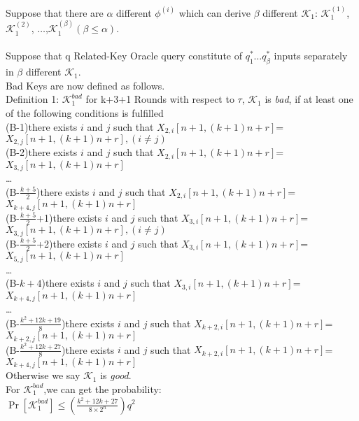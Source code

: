 \documentclass{article}
\begin{document}
Suppose that there are $\alpha$ different $\phi^{(i)}$ which can derive $\beta$ different $\mathcal{K}_{1}$: $\mathcal{K}_{1}^{(1)}$, $\mathcal{K}_{1}^{(2)}$, $\dots$,$\mathcal{K}_{1}^{(\beta)}$$(\beta\leq \alpha)$.\\\\
Suppose that q Related-Key Oracle query constitute of $q_{1}^{\ast} \dots q_{\beta}^{\ast}$ inputs separately in $\beta$ different $\mathcal{K}_{1}$.\\


Bad Keys are now defined as follows.\\
Definition 1: $\mathcal{K}_{1}^{bad}$  for k+3+1 Rounds
with respect to $\tau$, $\mathcal{K}_{1}$  is {\it bad}, if at least one of the following conditions is fulfilled\\
(B-1)there exists $i$ and $j$ such that $X_{2,i}[n+1,(k+1)n+r]$=$X_{2,j}[n+1,(k+1)n+r],(i\neq j)$\\
(B-2)there exists $i$ and $j$ such that $X_{2,i}[n+1,(k+1)n+r]$=$X_{3,j}[n+1,(k+1)n+r]$\\
\dots\\
(B-$\frac{k+5}{2}$)there exists $i$ and $j$ such that $X_{2,i}[n+1,(k+1)n+r]$=$X_{k+4,j}[n+1,(k+1)n+r]$\\
(B-$\frac{k+5}{2}$+1)there exists $i$ and $j$ such that $X_{3,i}[n+1,(k+1)n+r]$=$X_{3,j}[n+1,(k+1)n+r],(i\neq j)$\\
(B-$\frac{k+5}{2}$+2)there exists $i$ and $j$ such that $X_{3,i}[n+1,(k+1)n+r]$=$X_{5,j}[n+1,(k+1)n+r]$\\
\dots \\
(B-$k+4$)there exists $i$ and $j$ such that $X_{3,i}[n+1,(k+1)n+r]$=$X_{k+4,j}[n+1,(k+1)n+r]$\\
\dots \\
(B-$\frac{k^{2}+12k+19}{8}$)there exists $i$ and $j$ such that $X_{k+2,i}[n+1,(k+1)n+r]$=$X_{k+2,j}[n+1,(k+1)n+r]$\\
(B-$\frac{k^{2}+12k+27}{8}$)there exists $i$ and $j$ such that $X_{k+2,i}[n+1,(k+1)n+r]$=$X_{k+4,j}[n+1,(k+1)n+r]$\\

Otherwise we say $\mathcal{K}_{1}$ is {\it good}.\\
For $\mathcal{K}_{1}^{bad}$,we can get the probability:\\
$\Pr[\mathcal{K}_{1}^{bad}]\leq (\frac{k^{2}+12k+27}{8\times2^{n}})q^{2}$\\
\end{document}
